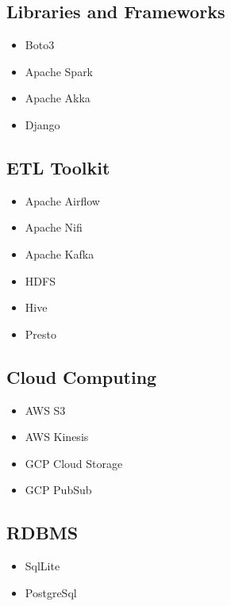 \documentclass[12pt,a4paper,sans]{moderncv}        %
\begin{document}
\vspace{-15pt}

\subsection{Libraries and Frameworks}
\vspace{-10pt}
\begin{multicols}{2}
\begin{itemize}\setlength{\itemsep}{-5pt}%
\item Boto3
\item Apache Spark
\item Apache Akka
\item Django
\end{itemize}
\end{multicols}
\vspace{-10pt}

\subsection{ETL Toolkit}
\vspace{-10pt}
\begin{multicols}{2}
\begin{itemize}\setlength{\itemsep}{-5pt}%
\item Apache Airflow
\item Apache Nifi
\item Apache Kafka
\item HDFS
\item Hive
\item Presto
\end{itemize}
\end{multicols}


\vspace{-10pt}
\subsection{Cloud Computing}
\vspace{-10pt}
\begin{multicols}{2}
\begin{itemize}\setlength{\itemsep}{-5pt}%
\item AWS S3
\item AWS Kinesis
\item GCP Cloud Storage
\item GCP PubSub
\end{itemize}
\end{multicols}
\newpage
\subsection{RDBMS}
\vspace{-10pt}
\begin{multicols}{2}
\begin{itemize}\setlength{\itemsep}{-5pt}%
\item SqlLite
\item PostgreSql
\end{itemize}
\end{multicols}
\vspace{-10pt}
\end{document}
